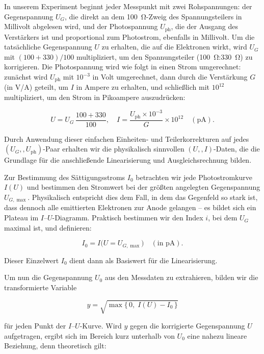 In unserem Experiment beginnt jeder Messpunkt mit zwei Rohspannungen: der Gegenspannung $U_{G}$, die direkt an dem \SI{100}{\ohm}-Zweig des Spannungsteilers in Millivolt abgelesen wird, und der Photospannung $U_{\mathrm{ph}}$, die der Ausgang des Verstärkers ist und proportional zum Photostrom, ebenfalls in Millivolt. Um die tatsächliche Gegenspannung $U$ zu erhalten, die auf die Elektronen wirkt, wird $U_{G}$ mit $(100+330)/100$ multipliziert, um den Spannungsteiler (\SI{100}{\ohm}:\SI{330}{\ohm}) zu korrigieren. Die Photospannung wird wie folgt in einen Strom umgerechnet: zunächst wird $U_{\mathrm{ph}}$ mit $10^{-3}$ in Volt umgerechnet, dann durch die Verstärkung $G$ (in V/A) geteilt, um $I$ in Ampere zu erhalten, und schließlich mit $10^{12}$ multipliziert, um den Strom in Pikoampere auszudrücken:

\begin{equation}
  U = U_{G}\,\frac{100 + 330}{100},\quad
  I = \frac{U_{\mathrm{ph}}\times10^{-3}}{G}\times10^{12}
  \quad(\mathrm{pA}).
\end{equation}

Durch Anwendung dieser einfachen Einheiten- und Teilerkorrekturen auf jedes $(U_{G},,U_{\mathrm{ph}})$-Paar erhalten wir die physikalisch sinnvollen $(U,,I)$-Daten, die die Grundlage für die anschließende Linearisierung und Ausgleichsrechnung bilden.

Zur Bestimmung des Sättigungsstroms $I_{0}$ betrachten wir jede Photostromkurve $I(U)$ und bestimmen den Stromwert bei der größten angelegten Gegenspannung $U_{G,\max}$. Physikalisch entspricht dies dem Fall, in dem das Gegenfeld so stark ist, dass dennoch alle emittierten Elektronen zur Anode gelangen – es bildet sich ein Plateau im $I$–$U$-Diagramm. Praktisch bestimmen wir den Index $i$, bei dem $U_{G}$ maximal ist, und definieren:

\begin{equation}
  I_{0} = I\bigl(U = U_{G,\max}\bigr)\quad(\text{in pA}).
\end{equation}

Dieser Einzelwert $I_{0}$ dient dann als Basiswert für die Linearisierung.

Um nun die Gegenspannung $U_{0}$ aus den Messdaten zu extrahieren, bilden wir die transformierte Variable

\begin{equation}
  y = \sqrt{\max\{\,0,\;I(U) - I_{0}\,\}}
\end{equation}

für jeden Punkt der $I$–$U$-Kurve. Wird $y$ gegen die korrigierte Gegenspannung $U$ aufgetragen, ergibt sich im Bereich kurz unterhalb von $U_{0}$ eine nahezu lineare Beziehung, denn theoretisch gilt:


